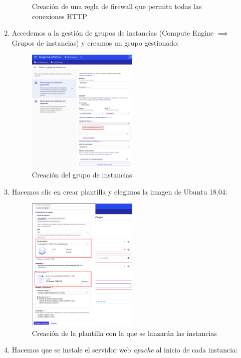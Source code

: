 \documentclass[12pt,spanish]{article}
\begin{document}
\begin{enumerate}
\begin{figure}[H]
			\caption{Creación de una regla de firewall que permita todas las conexiones HTTP}
		\end{figure}
	\item Accedemos a la gestión de grupos de instancias (Compute Engine $\implies$ Grupos de instancias) y creamos un grupo gestionado:
	\begin{figure}[H]
		\centering
		\includegraphics[width=0.5\textwidth]{project/createig.png}
		\caption{Creación del grupo de instancias}
	\end{figure}
	\item Hacemos clic en crear plantilla y elegimos la imagen de Ubuntu 18.04:
	\begin{figure}[H]
		\centering
		\includegraphics[width=0.5\textwidth]{project/createtemplate.png}
		\caption{Creación de la plantilla con la que se lanzarán las instancias}
	\end{figure}
	\item Hacemos que se instale el servidor web \emph{apache} al inicio de cada instancia:
	\begin{figure}[H]

\end{figure}
\end{enumerate}
\end{document}
